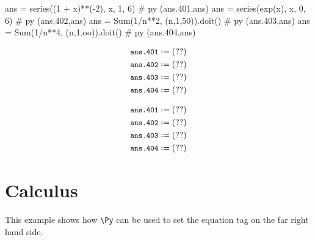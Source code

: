 \documentclass[12pt]{pylatex}
\begin{document}
\vspace{-10pt}

\begin{minipage}[t]{0.65\textwidth}
\begin{python}
   ans = series((1 + x)**(-2), x, 1, 6)         # py (ans.401,ans)
   ans = series(exp(x), x, 0, 6)                # py (ans.402,ans)
   ans = Sum(1/n**2, (n,1,50)).doit()           # py (ans.403,ans)
   ans = Sum(1/n**4, (n,1,oo)).doit()           # py (ans.404,ans)
\end{python}
\end{minipage}
\hskip 1cm
\begin{minipage}[t]{0.35\textwidth}
\begin{latex}
   \begin{align*}
      &\py*{ans.401}\\
      &\py*{ans.402}\\
      &\py*{ans.403}\\
      &\py*{ans.404}
   \end{align*}
\end{latex}
\end{minipage}

\begin{align*}
   &\py*{ans.401}\\
   &\py*{ans.402}\\
   &\py*{ans.403}\\
   &\py*{ans.404}
\end{align*}

\clearpage

\section*{Calculus}

This example shows how {\tt\small\verb|\Py|} can be used to set the equation tag on the far right hand side.
\end{document}
